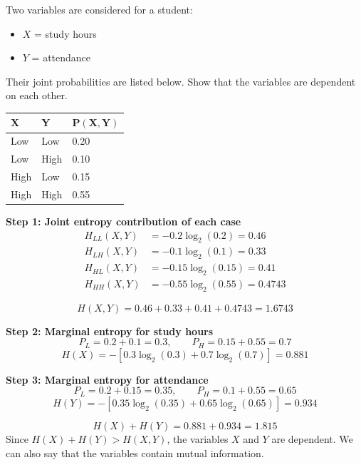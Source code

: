 \documentclass[11pt,a4paper]{book}
\renewcommand{\arraystretch}{1.4}
\newenvironment{infobox}[1][Information]{%
    \begin{tcolorbox}[
        enhanced,
        breakable,
        colback=mintgreen!10,
        colframe=mintgreen!200,
        title=#1,
        fonttitle=\bfseries,
        sharp corners,
        boxrule=0.8pt,
        left=8pt,
        right=8pt,
        top=6pt,
        bottom=6pt
    ]
}{\end{tcolorbox}}
\newcounter{qna}[chapter]
\renewcommand{\theqna}{\thechapter.\arabic{qna}}
\newenvironment{questionanswerbox}[1][Example]{%
    \refstepcounter{qna}
    \begin{tcolorbox}[
        enhanced,
        breakable,
        colback=softlavender!10,
        colframe=softlavender!200,
        title={#1~\theqna},
        fonttitle=\bfseries,
        coltitle=white,
        colbacktitle=softlavender!200,
        sharp corners,
        boxrule=1pt,
        left=8pt,
        right=8pt,
        top=6pt,
        bottom=6pt
    ]
}{\end{tcolorbox}}
\begin{document}
\begin{questionanswerbox}[Example]
Two variables are considered for a student:
\begin{itemize}
    \item $X$ = study hours
    \item $Y$ = attendance
\end{itemize}

Their joint probabilities are listed below. Show that the variables are dependent on each other.

\renewcommand{\arraystretch}{1.3}
\setlength{\tabcolsep}{8pt}
\begin{center}
\begin{tabular}{|C{2.8cm}|C{2.8cm}|C{2.8cm}|}
    \hline
    \textbf{X} & \textbf{Y} & $\mathbf{P(X,Y)}$ \\ \hline
    Low  & Low  & 0.20 \\ \hline
    Low  & High & 0.10 \\ \hline
    High & Low  & 0.15 \\ \hline
    High & High & 0.55 \\ \hline
\end{tabular}
\end{center}

\textbf{Step 1: Joint entropy contribution of each case}
\begin{align*}
H_{LL}(X,Y) &= -0.2\log_2(0.2) = 0.46 \\
H_{LH}(X,Y) &= -0.1\log_2(0.1) = 0.33 \\
H_{HL}(X,Y) &= -0.15\log_2(0.15) = 0.41 \\
H_{HH}(X,Y) &= -0.55\log_2(0.55) = 0.4743
\end{align*}

\[
H(X,Y) = 0.46 + 0.33 + 0.41 + 0.4743 = 1.6743
\]

\textbf{Step 2: Marginal entropy for study hours}
\[
P_L = 0.2 + 0.1 = 0.3, \qquad P_H = 0.15 + 0.55 = 0.7
\]
\[
H(X) = -\left[0.3\log_2(0.3) + 0.7\log_2(0.7)\right] = 0.881
\]

\textbf{Step 3: Marginal entropy for attendance}
\[
P_L = 0.2 + 0.15 = 0.35, \qquad P_H = 0.1 + 0.55 = 0.65
\]
\[
H(Y) = -\left[0.35\log_2(0.35) + 0.65\log_2(0.65)\right] = 0.934
\]
\end{questionanswerbox}

\begin{infobox}[Conclusion]
\[
H(X) + H(Y) = 0.881 + 0.934 = 1.815
\]
Since $H(X) + H(Y) > H(X,Y)$, the variables $X$ and $Y$ are dependent. We can also say that the variables contain mutual information.
\end{infobox}
\end{document}
